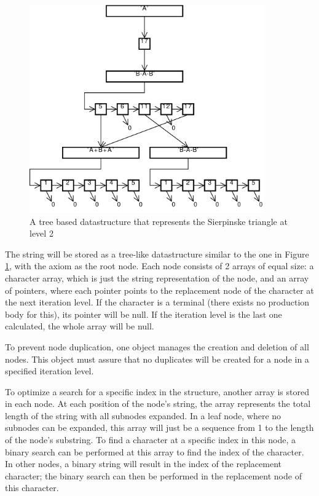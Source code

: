 \documentclass[11pt,a4paper]{article}
\begin{document}
\begin{figure}[h!]
  \centering
  \includegraphics[width=0.9\textwidth]{struct.pdf}
  \caption{A tree based datastructure that represents the Sierpinske triangle at level 2}
  \label{fig:struct}
\end{figure}

The string will be stored as a tree-like datastructure similar to the one in Figure \ref{fig:struct}, with the axiom as the root node. Each node consists of 2 arrays of equal size: a character array, which is just the string representation of the node, and an array of pointers, where each pointer points to the replacement node of the character at the next iteration level. If the character is a terminal (there exists no production body for this), its pointer will be null. If the iteration level is the last one calculated, the whole array will be null.

To prevent node duplication, one object manages the creation and deletion of all nodes. This object must assure that no duplicates will be created for a node in a specified iteration level.

To optimize a search for a specific index in the structure, another array is stored in each node. At each position of the node's string, the array represents the total length of the string with all subnodes expanded. 
In a leaf node, where no subnodes can be expanded, this array will just be a sequence from 1 to the length of the node's substring. To find a character at a specific index in this node, a binary search can be performed at this array to find the index of the character. In other nodes, a binary string will result in the index of the replacement character; the binary search can then be performed in the replacement node of this character.
\end{document}
